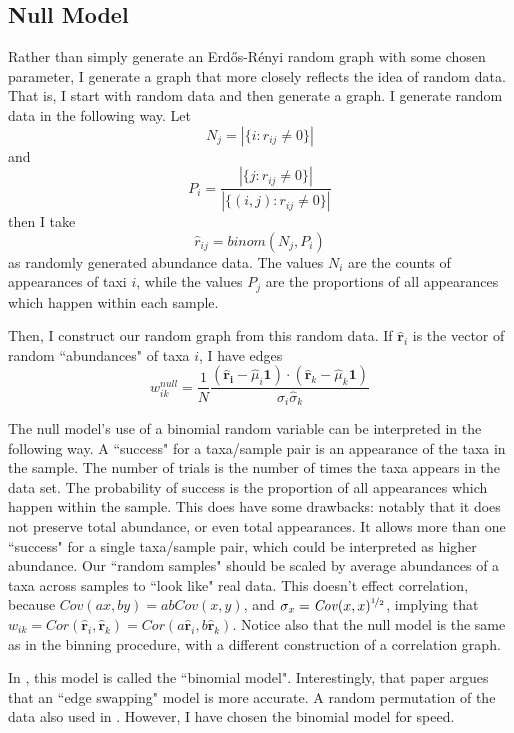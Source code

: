 \documentclass[10pt]{article}
\theoremstyle{definition}
\numberwithin{theorem}{section}
\numberwithin{definition}{section}
\numberwithin{lemma}{section}
\numberwithin{corollary}{section}
\numberwithin{clm}{section}
\numberwithin{rmk}{section}
\newcommand{\nhalf}{\nicefrac{1}{2}}
\renewcommand{\b}{\bm}
\begin{document}
\subsection{Null Model}
Rather than simply generate an Erd\H{o}s-R\'{e}nyi random graph with some chosen parameter, I generate a graph that more closely reflects the idea of random data. That is, I start with random data and then generate a graph. I generate random data in the following way. Let 
\[
N_j = |\{i: r_{ij} \neq 0\}|
\]
and 
\[
P_i = \frac{|\{j: r_{ij}\neq 0 \}|}{|\{(i,j): r_{ij}\neq 0 \}|}
\]
then I take 
\[
\hat{r}_{ij} = \mathit{binom}(N_j,P_i)
\]
as randomly generated abundance data. The values $N_i$ are the counts of appearances of taxi $i$, while the values $P_j$ are the proportions of all appearances which happen within each sample. 
		
Then, I construct our random graph from this random data. If $\hat{\b{r}}_i$ is the vector of random ``abundances" of taxa $i$, I have edges
\[
w_{ik}^{null} = \frac{1}{N}\frac{(\b{\hat{\b{r}}_i}- \hat{\mu}_i\b{1}) \cdot (\hat{\b{r}}_k - \hat{\mu}_k\b{1})}{\hat{\sigma}_i \hat{\sigma}_k}
\]

The null model's use of a binomial random variable can be interpreted in the following way. A ``success" for a taxa/sample pair is an appearance of the taxa in the sample. The number of trials is the number of times the taxa appears in the data set. The probability of success is the proportion of all appearances which happen within the sample. This does have some drawbacks: notably that it does not preserve total abundance, or even total appearances. It allows more than one ``success" for a single taxa/sample pair, which could be interpreted as higher abundance. Our ``random samples" should be scaled by average abundances of a taxa across samples to ``look like" real data. This doesn't effect correlation, because $\mathit{Cov}(ax,by) = ab\mathit{Cov}(x,y)$, and $\sigma_x = \mathit{Cov}(x,x)^{\nhalf}$, implying that $w_{ik} = \mathit{Cor}(\hat{\b{r}}_i,\hat{\b{r}}_k) =  \mathit{Cor}(a\hat{\b{r}}_i,b\hat{\b{r}}_k)$. Notice also that the null model is the same as in the binning procedure, with a different construction of a correlation graph.

In \cite{coocc}, this model is called the ``binomial model". Interestingly, that paper argues that an ``edge swapping" model is more accurate. A random permutation of the data also used in \cite{gut}. However, I have chosen the binomial model for speed.
\end{document}
